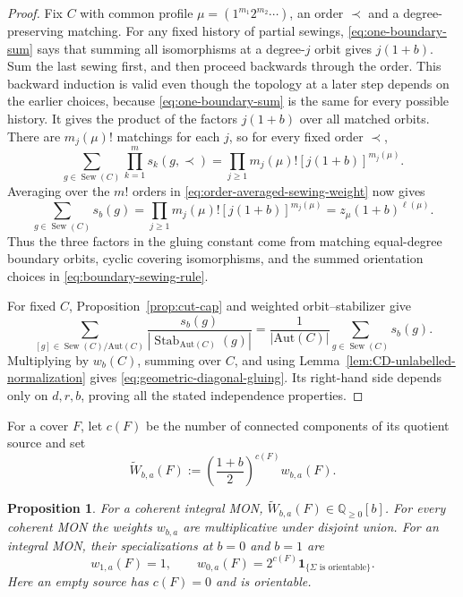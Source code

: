 \documentclass[11pt,a4paper,reqno]{article}
\newtheorem{proposition}[theorem]{Proposition}
\theoremstyle{definition}
\theoremstyle{remark}
\newcommand\Q{{\mathbb Q}}
\newcommand\one{{\mathbf 1}}
\newcommand\ellpart{{\ell}}
\newcommand\Aut{{\mathrm{Aut}}}
\begin{document}
\begin{proof}
Fix $C$ with common profile $\mu=(1^{m_1}2^{m_2}\cdots)$, an order $\prec$ and a degree-preserving matching.  For any fixed history of partial sewings, \eqref{eq:one-boundary-sum} says that summing all isomorphisms at a degree-$j$ orbit gives $j(1+b)$.  Sum the last sewing first, and then proceed backwards through the order.  This backward induction is valid even though the topology at a later step depends on the earlier choices, because \eqref{eq:one-boundary-sum} is the same for every possible history.  It gives the product of the factors $j(1+b)$ over all matched orbits.  There are $m_j(\mu)!$ matchings for each $j$, so for every fixed order $\prec$,
\[
\sum_{g\in\operatorname{Sew}(C)}\prod_{k=1}^m s_k(g,\prec) =\prod_{j\geq1}m_j(\mu)![j(1+b)]^{m_j(\mu)}.
\]
Averaging over the $m!$ orders in \eqref{eq:order-averaged-sewing-weight} now gives
\begin{equation}\label{eq:gluing-factor}
\sum_{g\in\operatorname{Sew}(C)}s_b(g) =\prod_{j\geq1}m_j(\mu)![j(1+b)]^{m_j(\mu)} =z_\mu(1+b)^{\ellpart(\mu)}.
\end{equation}
Thus the three factors in the gluing constant come from matching equal-degree boundary orbits, cyclic covering isomorphisms, and the summed orientation choices in \eqref{eq:boundary-sewing-rule}.

For fixed $C$, Proposition~\ref{prop:cut-cap} and weighted orbit--stabilizer give
\[
\sum_{[g]\in\operatorname{Sew}(C)/\Aut(C)} \frac{s_b(g)}{|\operatorname{Stab}_{\Aut(C)}(g)|} =\frac1{|\Aut(C)|}\sum_{g\in\operatorname{Sew}(C)}s_b(g).
\]
Multiplying by $w_b(C)$, summing over $C$, and using Lemma~\ref{lem:CD-unlabelled-normalization} gives \eqref{eq:geometric-diagonal-gluing}.  Its right-hand side depends only on $d,r,b$, proving all the stated independence properties.
\end{proof}


For a cover $F$, let $c(F)$ be the number of connected components of its quotient source and set
\begin{equation}\label{eq:normalized-elliptic-weight}
\widetilde W_{b,a}(F) :=\left(\frac{1+b}{2}\right)^{c(F)}w_{b,a}(F).
\end{equation}

\begin{proposition}\label{prop:elliptic-weight-properties}
For a coherent integral MON, $\widetilde W_{b,a}(F)\in\Q_{\geq0}[b]$.  For every coherent MON the weights $w_{b,a}$ are multiplicative under disjoint union.  For an integral MON, their specializations at $b=0$ and $b=1$ are
\begin{equation}\label{eq:elliptic-weight-specializations}
w_{1,a}(F)=1, \qquad w_{0,a}(F)=2^{c(F)}\one_{\{\Sigma\text{ is orientable}\}}.
\end{equation}
Here an empty source has $c(F)=0$ and is orientable.
\end{proposition}
\end{document}
